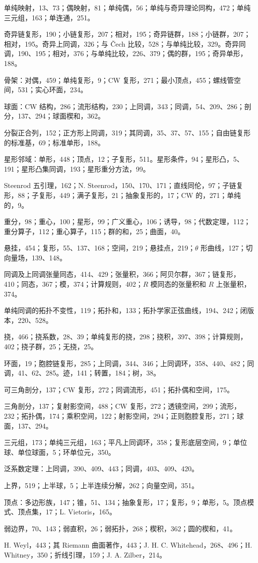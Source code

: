 单纯映射，13、73；偶映射，81；单纯偶，56；单纯与奇异理论同构，472；单纯三元组，163；单连通，251。

奇异链复形，190；小链复形，207；相对，195；奇异链群，188；小链群，207；相对，195。奇异上同调，326；与 Čech 比较，528；与单纯比较，329。奇异同调，190、195；相对，376；与单纯比较，226、379；偶的群，195；奇异单形，188。

骨架：对偶，459；单纯复形，9；CW 复形，271；最小顶点，455；螺线管空间，531；实心环面，234。

球面：CW 结构，286；流形结构，230；上同调，343；同调，54、209、286；剖分，137、294；球面楔和，362。

分裂正合列，152；正方形上同调，319；其同调，35、37、57、155；自由链复形的标准基，69；标准单形，188。

星形邻域：单形，448；顶点，12；子复形，511。星形条件，94；星形凸，5、191；星形凸集同调，193；星形重分方法，99。

Steenrod 五引理，162；N. Steenrod，150、170、171；直线同伦，97；子链复形，88；子复形，449；满子复形，21；抽象复形的，17；CW 的，271；单纯的，9。

重分，98；重心，100；星形，99；广义重心，106；诱导，98；代数定理，112；重分算子，112；重心算子，115；群的和，25；曲面，40。

悬挂，454；复形，55、137、168；空间，219；悬挂点，219；$\theta$ 形曲线，127；切向量场，139、148。

同调及上同调张量同态，414、429；张量积，366；阿贝尔群，367；链复形，410；同态，367；模，374；计算规则，402；$R$ 模同态的张量积和 $R$ 上张量积，374。

单纯同调的拓扑不变性，119；拓扑和，133；拓扑学家正弦曲线，194、242；闭版本，220、528。

挠，466；挠系数，28、39；单纯复形的挠，298；挠积，397、398；计算规则，402；挠子群，25；无挠，25。

环面，19；胞腔链复形，285；上同调，344、346；上同调环，358、440、482；同调，41、62、285。迹，141；转置，184；树，38。

可三角剖分，137；CW 复形，272；同调流形，451；拓扑偶和空间，175。

三角剖分，137；复射影空间，488；CW 复形，272；透镜空间，299；流形，232；拓扑偶，174；乘积空间，122；射影空间，294；正则胞腔复形，271；球面，137、294。

三元组，173；单纯三元组，163；平凡上同调环，358；复形底层空间，9；单位球、单位球面，5；环单位元，350。

泛系数定理：上同调，390、409、443；同调，403、409、420。

上界，519；上半球，5；上半连续分解，262；向量空间，351。

顶点：多边形族，147；锥，51、134；抽象复形，17；复形，9；单形，5。顶点模式、顶点集，17；L. Vietoris，165。

弱边界，70、143；弱直积，26；弱拓扑，268；楔积，362；圆的楔和，41。

H. Weyl，443；其 Riemann 曲面著作，443；J. H. C. Whitehead，268、496；H. Whitney，350；折线引理，159；J. A. Zilber，214。
\endgroup
